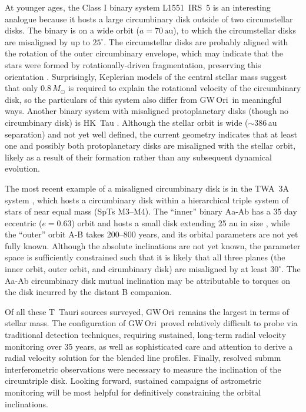 \documentclass[twocolumn]{aastex61}
\newcommand{\obj}{GW\,Ori}
\begin{document}
At younger ages, the Class I binary system L1551~IRS~5 is an interesting analogue because it hosts a large circumbinary disk \citep[$r\sim500$\,au, $M_\mathrm{disk} \approx 0.07 \,M_\odot$;][]{eisner12,takakuwa17} outside of two circumstellar disks. The binary is on a wide orbit ($a = 70\,\mathrm{au}$), to which the circumstellar disks are misaligned by up to $25^\circ$. The circumstellar disks are probably aligned with the rotation of the outer circumbinary envelope, which may indicate that the stars were formed by rotationally-driven fragmentation, preserving this orientation \citep{lim16}. Surprisingly, Keplerian models of the central stellar mass suggest that only $0.8\,M_\odot$ is required to explain the rotational velocity of the circumbinary disk, so the particulars of this system also differ from \obj\ in meaningful ways. Another binary system with misaligned protoplanetary disks (though no circumbinary disk) is HK~Tau \citep{jensen14}. Although the stellar orbit is wide ($\sim$386\,au separation) and not yet well defined, the current geometry indicates that at least one and possibly both protoplanetary disks are misaligned with the stellar orbit, likely as a result of their formation rather than any subsequent dynamical evolution.

The most recent example of a misaligned circumbinary disk is in the TWA~3A system \citep{kellog17}, which hosts a circumbinary disk within a hierarchical triple system of stars of near equal mass (SpTs M3--M4). The ``inner'' binary Aa-Ab has a 35 day eccentric ($e=0.63$) orbit and hosts a small disk extending 25 au in size \citep{andrews10}, while the ``outer'' orbit A-B takes 200--800 years, and its orbital parameters are not yet fully known. Although the absolute inclinations are not yet known, the parameter space is sufficiently constrained such that it is likely that all three planes (the inner orbit, outer orbit, and cirumbinary disk) are misaligned by at least $30^\circ$. The Aa-Ab circumbinary disk mutual inclination may be attributable to torques on the disk incurred by the distant B companion.

Of all these T~Tauri sources surveyed, \obj\ remains the largest in terms of stellar mass. The configuration of \obj\ proved relatively difficult to probe via traditional detection techniques, requiring sustained, long-term radial velocity monitoring over 35 years, as well as sophisticated care and attention to derive a radial velocity solution for the blended line profiles. Finally, resolved submm interferometric observations were necessary to measure the inclination of the circumtriple disk. Looking forward, sustained campaigns of astrometric monitoring will be most helpful for definitively constraining the orbital inclinations.
\end{document}
